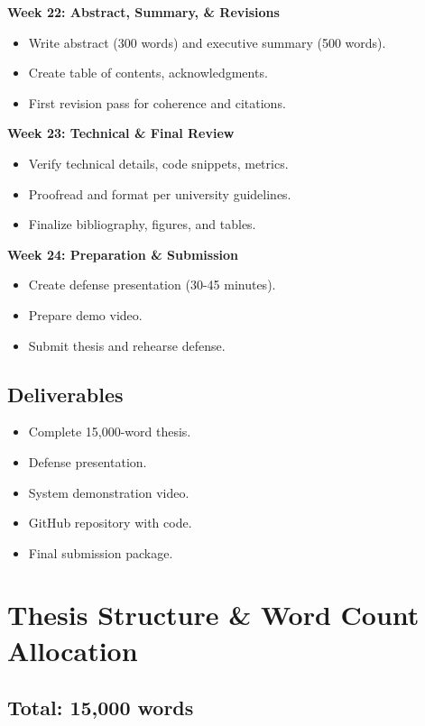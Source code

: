 \documentclass[12pt,a4paper]{article}
\begin{document}
\textbf{Week 22: Abstract, Summary, \& Revisions}
\begin{itemize}
    \item Write abstract (300 words) and executive summary (500 words).
    \item Create table of contents, acknowledgments.
    \item First revision pass for coherence and citations.
\end{itemize}

\textbf{Week 23: Technical \& Final Review}
\begin{itemize}
    \item Verify technical details, code snippets, metrics.
    \item Proofread and format per university guidelines.
    \item Finalize bibliography, figures, and tables.
\end{itemize}

\textbf{Week 24: Preparation \& Submission}
\begin{itemize}
    \item Create defense presentation (30-45 minutes).
    \item Prepare demo video.
    \item Submit thesis and rehearse defense.
\end{itemize}

\subsection*{Deliverables}

\begin{itemize}
    \item Complete 15,000-word thesis.
    \item Defense presentation.
    \item System demonstration video.
    \item GitHub repository with code.
    \item Final submission package.
\end{itemize}

\section{Thesis Structure \& Word Count Allocation}

\subsection*{Total: 15,000 words}
\end{document}
